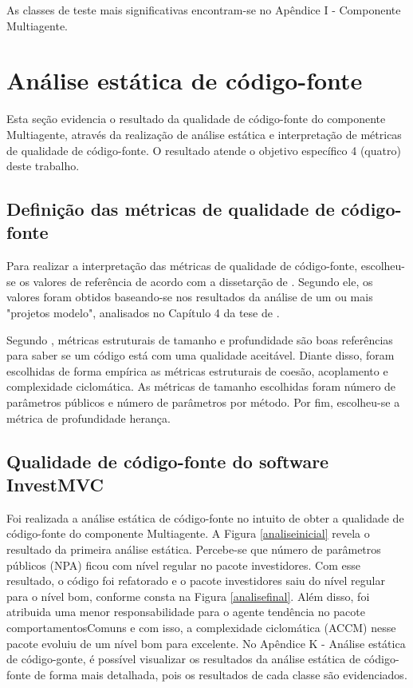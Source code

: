 As classes de teste mais significativas encontram-se no Apêndice I - Componente Multiagente.

\section{Análise estática de código-fonte}
Esta seção evidencia o resultado da qualidade de código-fonte  do componente Multiagente, através da realização de análise estática e interpretação de métricas de qualidade de código-fonte. O resultado atende o objetivo específico 4 (quatro) deste trabalho.
\subsection{Definição das métricas de qualidade de código-fonte}
Para realizar a interpretação das métricas de qualidade de código-fonte, escolheu-se os valores de referência de acordo com a dissetarção de \cite{filho}. Segundo ele, os valores foram obtidos baseando-se nos resultados da análise de um ou mais "projetos
modelo", analisados no Capítulo 4 da tese de .

Segundo , métricas estruturais de tamanho e profundidade são boas referências para saber se um código está com uma qualidade aceitável. Diante disso, foram escolhidas de forma empírica as métricas estruturais de coesão, acoplamento e complexidade ciclomática. As métricas de tamanho escolhidas foram número de parâmetros públicos e número de parâmetros por método. Por fim, escolheu-se a métrica de profundidade herança.

\subsection{Qualidade de código-fonte do software InvestMVC}
Foi realizada a análise estática de código-fonte no intuito de obter a qualidade de código-fonte do componente Multiagente. A Figura \ref{analiseinicial} revela o resultado da primeira análise estática. Percebe-se que número de parâmetros públicos (NPA) ficou com nível regular no pacote investidores. Com esse resultado, o código foi refatorado e o pacote investidores saiu do nível regular para o nível bom, conforme consta na Figura \ref{analisefinal}. Além disso, foi atribuida uma menor responsabilidade para o agente tendência no pacote comportamentosComuns e com isso, a complexidade ciclomática (ACCM) nesse pacote evoluiu de um nível bom para excelente. No Apêndice K - Análise estática de código-gonte, é possível visualizar os resultados da análise estática de código-fonte de forma mais detalhada, pois os resultados de cada classe são evidenciados.

